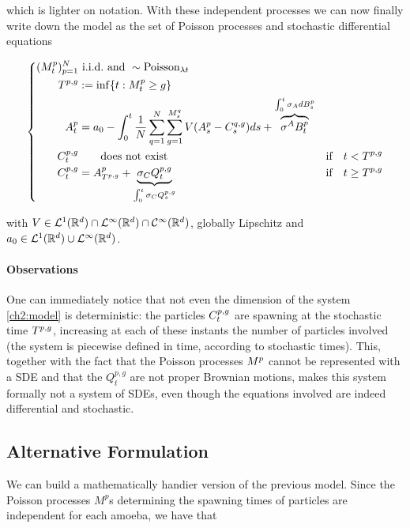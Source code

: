 which is lighter on notation.
With these independent processes we can now finally write down the model as the set of Poisson processes and stochastic differential equations

\begin{equation}\label{ch2:model}
\left\{
\begin{aligned}
(M^p_t)_{p=1}^N 
&\text{ \mbox{i.i.d.}\ and } \sim \text{Poisson}_{\lambda t}
&
\\
T^{p,g} 
&:= \inf \{ t : M^p_t \geq g \}
&
\\
A_t^p 
&= a_0
- \int_0^t \frac{1}{N} \sum _{q = 1}^{N} \sum_{g = 1}^{M_s^q} V(A_s^p - C_s^{q,g}) d s
+ 
\overbrace{\sigma^A B_t^p}^{\int_0^t \sigma_A d B_s^p}
&
\\
C_t^{p,g} 
&\qquad\text{does not exist} 
&\text{if} \quad t < T^{p,g}
\\
C_t^{p,g}
&= A_{T^{p,g}}^p + \underbrace{\sigma_C Q_t^{p,g}}_{\int_0^t \sigma_C Q_s^{p,g}} 
&\text{if} \quad t \geq T^{p,g}
\end{aligned}
\right.
\end{equation}

with $V \in \mathcal{L}^1(\mathbb{R}^d) \cap \mathcal{L}^\infty(\mathbb{R}^d) \cap \mathcal{C}^\infty(\mathbb{R}^d)$, globally Lipschitz and $a_0 \in \mathcal{L}^1(\mathbb{R}^d) \cup \mathcal{L}^\infty(\mathbb{R}^d)$.

\paragraph{Observations} One can immediately notice that not even the dimension of the system \ref{ch2:model} is deterministic: the particles $C_t^{p,g}$ are spawning at the stochastic time $T^{p,g}$, increasing at each of these instants the number of particles involved (\ie the system is piecewise defined in time, according to stochastic times).
This, together with the fact that the Poisson processes $M^p$ cannot be represented with a SDE and that the $Q_t^{p,g}$ are not proper Brownian motions, makes this system formally not a system of SDEs, even though the equations involved are indeed differential and stochastic.

\subsection{Alternative Formulation}

We can build a mathematically handier version of the previous model.
Since the Poisson processes $M^p$s determining the spawning times of particles are independent for each amoeba, we have that

